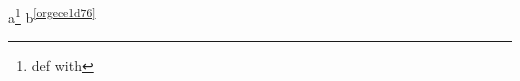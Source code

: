 \documentclass[11pt]{article}
\author{root}
\date{\today}
\title{}
\begin{document}
\tableofcontents

a\footnote{def with \footnotemark} b\textsuperscript{\ref{orgece1d76}}
\end{document}
